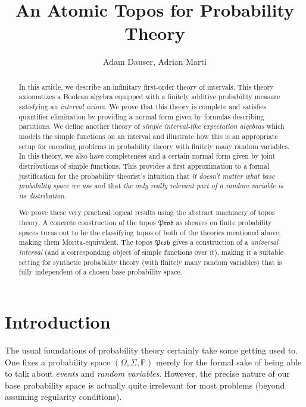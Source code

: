 \documentclass[a4paper]{amsproc}
\title{An Atomic Topos for Probability Theory}
\author{Adam Dauser, Adrian Marti}
\date{}
\theoremstyle{plain}
\theoremstyle{definition}
\theoremstyle{remark}
\numberwithin{equation}{section}
\newcommand{\Prob}{\mathfrak{Prob}}
\begin{document}
\begin{abstract}
In this article, we describe an infinitary first-order theory of intervals. This theory axiomatizes a Boolean algebra equipped with a finitely additive probability measure satisfying an \emph{interval axiom}. We prove that this theory is complete and satisfies quantifier elimination by providing a normal form given by formulas describing partitions. We define another theory of \emph{simple interval-like expectation algebras} which models the simple functions on an interval and illustrate how this is an appropriate setup for encoding problems in probability theory with finitely many random variables. In this theory, we also have completeness and a certain normal form given by joint distributions of simple functions. This provides a first approximation to a formal justification for the probability theorist's intuition that \emph{it doesn't matter what base probability space we use} and that \emph{the only really relevant part of a random variable is its distribution}.

We prove these very practical logical results using the abstract machinery of topos theory. A concrete construction of the topos $\Prob$ as sheaves on finite probability spaces turns out to be the classifying topos of both of the theories mentioned above, making them Morita-equivalent. The topos $\Prob$ gives a construction of a \emph{universal interval} (and a corresponding object of simple functions over it), making it a suitable setting for synthetic probability theory (with finitely many random variables) that is fully independent of a chosen base probability space.
\end{abstract}

\maketitle

\tableofcontents


\section{Introduction}

The usual foundations of probability theory certainly take some getting used to. One fixes a probability space $(\Omega,\Sigma, \mathbb{P})$ merely for the formal sake of being able to talk about \emph{events} and \emph{random variables}. However, the precise nature of our base probability space is actually quite irrelevant for most problems (beyond assuming regularity conditions).
\end{document}
